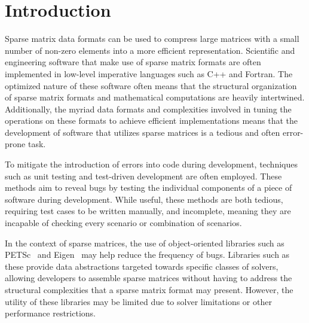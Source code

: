 \section{Introduction}

Sparse matrix data formats can be used to compress large matrices with a small number of non-zero elements into a more efficient representation.  
Scientific and engineering software that make use of sparse matrix formats are often implemented in low-level imperative languages such as C++ and Fortran.  The optimized nature of these software often means that the structural organization of sparse matrix formats and mathematical computations are heavily intertwined.  Additionally, the myriad data formats and complexities involved in tuning the operations on these formats to achieve efficient implementations means that the development of software that utilizes sparse matrices is a tedious and often error-prone task.

To mitigate the introduction of errors into code during development, techniques such as unit testing and test-driven development are often employed.  These methods aim to reveal bugs by testing the individual components of a piece of software during development.  While useful, these methods are both tedious, requiring test cases to be written manually, and incomplete, meaning they are incapable of checking every scenario or combination of scenarios.

In the context of sparse matrices, the use of object-oriented libraries such as PETSc~\cite{petsc2019} and Eigen~\cite{eigenweb2010} may help reduce the frequency of bugs.  Libraries such as these provide data abstractions targeted towards specific classes of solvers, allowing developers to assemble sparse matrices without having to address the structural complexities that a sparse matrix format may present.  However, the utility of these libraries may be limited due to solver limitations or other performance restrictions.

